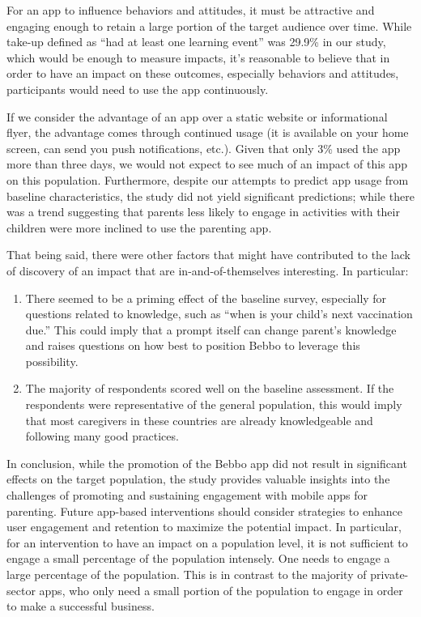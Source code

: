 \documentclass{article}
\begin{document}
For an app to influence behaviors and attitudes, it must be attractive and engaging enough to retain a large portion of the target audience over time. While take-up defined as “had at least one learning event” was 29.9\% in our study, which would be enough to measure impacts, it’s reasonable to believe that in order to have an impact on these outcomes, especially behaviors and attitudes, participants would need to use the app continuously.

If we consider the advantage of an app over a static website or informational flyer, the advantage comes through continued usage (it is available on your home screen, can send you push notifications, etc.). Given that only 3\% used the app more than three days, we would not expect to see much of an impact of this app on this population. Furthermore, despite our attempts to predict app usage from baseline characteristics, the study did not yield significant predictions; while there was a trend suggesting that parents less likely to engage in activities with their children were more inclined to use the parenting app.

That being said, there were other factors that might have contributed to the lack of discovery of an impact that are in-and-of-themselves interesting. In particular:

\begin{enumerate}
\item There seemed to be a priming effect of the baseline survey, especially for questions related to knowledge, such as “when is your child’s next vaccination due.” This could imply that a prompt itself can change parent’s knowledge and raises questions on how best to position Bebbo to leverage this possibility.
\item The majority of respondents scored well on the baseline assessment. If the respondents were representative of the general population, this would imply that most caregivers in these countries are already knowledgeable and following many good practices.
\end{enumerate}

In conclusion, while the promotion of the Bebbo app did not result in significant effects on the target population, the study provides valuable insights into the challenges of promoting and sustaining engagement with mobile apps for parenting. Future app-based interventions should consider strategies to enhance user engagement and retention to maximize the potential impact. In particular, for an intervention to have an impact on a population level, it is not sufficient to engage a small percentage of the population intensely. One needs to engage a large percentage of the population. This is in contrast to the majority of private-sector apps, who only need a small portion of the population to engage in order to make a successful business.
\end{document}
